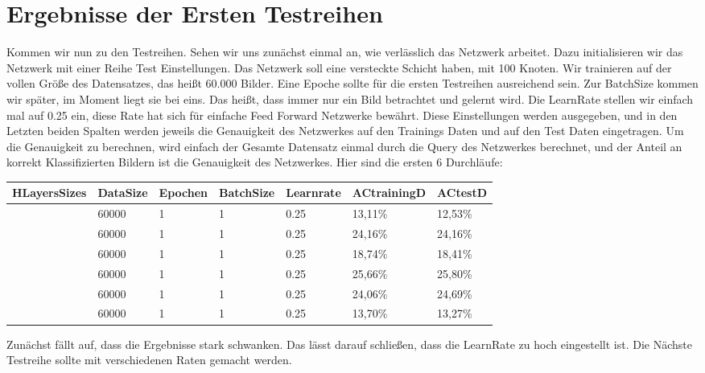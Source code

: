 \documentclass[12pt]{article}
\begin{document}
\section{Ergebnisse der Ersten Testreihen}
Kommen wir nun zu den Testreihen. Sehen wir uns zunächst einmal an, wie verlässlich das Netzwerk arbeitet. Dazu initialisieren wir das Netzwerk mit einer Reihe Test Einstellungen. Das Netzwerk soll eine versteckte Schicht haben, mit 100 Knoten. Wir trainieren auf der vollen Größe des Datensatzes, das heißt 60.000 Bilder. Eine Epoche sollte für die ersten Testreihen ausreichend sein. Zur BatchSize kommen wir später, im Moment liegt sie bei eins. Das heißt, dass immer nur ein Bild betrachtet und gelernt wird. Die LearnRate stellen wir einfach mal auf 0.25 ein, diese Rate hat sich für einfache Feed Forward Netzwerke bewährt. Diese Einstellungen werden ausgegeben, und in den Letzten beiden Spalten werden jeweils die Genauigkeit des Netzwerkes auf den Trainings Daten und auf den Test Daten eingetragen. Um die Genauigkeit zu berechnen, wird einfach der Gesamte Datensatz einmal durch die Query des Netzwerkes berechnet, und der Anteil an korrekt Klassifizierten Bildern ist die Genauigkeit des Netzwerkes.
Hier sind die ersten 6 Durchläufe:
\begin{table}[H]
    \centering
    \begin{tabular}{|l|l|l|l|l|l|l|}
    \hline
        HLayersSizes & DataSize & Epochen & BatchSize & Learnrate & ACtrainingD & ACtestD \\ \hline
        [780, 100, 10] & 60000 & 1 & 1 & 0.25 & 13,11\% & 12,53\% \\ \hline
        [780, 100, 10] & 60000 & 1 & 1 & 0.25 & 24,16\% & 24,16\% \\ \hline
        [780, 100, 10] & 60000 & 1 & 1 & 0.25 & 18,74\% & 18,41\% \\ \hline
        [780, 100, 10] & 60000 & 1 & 1 & 0.25 & 25,66\% & 25,80\% \\ \hline
        [780, 100, 10] & 60000 & 1 & 1 & 0.25 & 24,06\% & 24,69\% \\ \hline
        [780, 100, 10] & 60000 & 1 & 1 & 0.25 & 13,70\% & 13,27\% \\ \hline
    \end{tabular}
\end{table}
Zunächst fällt auf, dass die Ergebnisse stark schwanken. Das lässt darauf schließen, dass die LearnRate zu hoch eingestellt ist. Die Nächste Testreihe sollte mit verschiedenen Raten gemacht werden.
\end{document}
